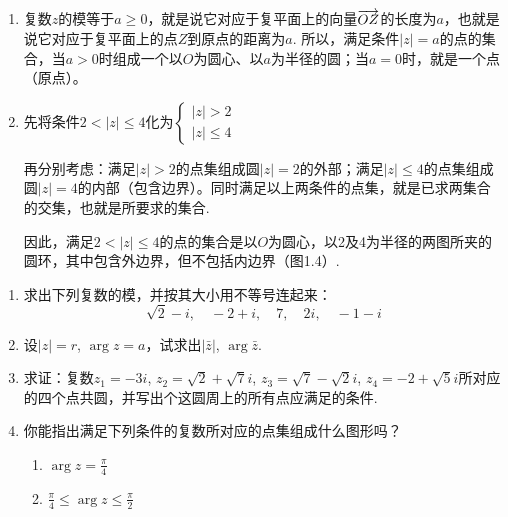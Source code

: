 \begin{solution}
\begin{enumerate}[(1)]
    \item 复数$z$的模等于$a\ge 0$，就是说它对应于复平面上的向量$\overrightarrow{OZ}$的长度为$a$，也就是说它对应于复平面上的点$Z$到原点的距离为$a$. 所以，满足条件$|z|=a$的点的集合，当$a>0$时组成一个以$O$为圆心、以$a$为半径的圆；当$a=0$时，就是一个点（原点）。
\item 先将条件$2<|z|\le 4$化为$\begin{cases}
    |z|>2\\ |z|\le 4
\end{cases}$

\begin{minipage}{.45\textwidth}
 再分别考虑：满足$|z|>2$的点集组成圆$|z|=2$的外部；满足$|z|\le 4$的点集组成圆$|z|=4$的内部（包含边界）。同时满足以上两条件的点集，就是已求两集合的交集，也就是所要求的集合.

因此，满足$2<|z|\le 4$的点的集合是以$O$为圆心，以2及4为半径的两图所夹的圆环，其中包含外边界，但不包括内边界（图1.4）.   
\end{minipage}\hfill
\begin{minipage}{.45\textwidth}
    \centering
{}
\end{minipage}

\end{enumerate}    
\end{solution}

\begin{ex}
\begin{enumerate}
    \item 求出下列复数的模，并按其大小用不等号连起来：
\[\sqrt{2}-i,\quad -2+i,\quad 7,\quad 2i,\quad -1-i\]
  \item   设$|z|=r$, $\arg z=a$，试求出$|\bar z|$, $\arg \bar z$.
  \item 求证：复数$z_1=-3i$, $z_2=\sqrt{2}+\sqrt{7}i$, $z_3=\sqrt{7}-\sqrt{2}i$, $z_4=-2+\sqrt{5}i$所对应的四个点共圆，并写出个这圆周上的所有点应满足的条件.
\item   你能指出满足下列条件的复数所对应的点集组成什么图形吗？
\begin{multicols}{2}
\begin{enumerate}[(1)]
    \item $\arg z=\frac{\pi}{4}$
    \item $\frac{\pi}{4}\le \arg z\le \frac{\pi}{2}$
\end{enumerate}
\end{multicols}
\end{enumerate}

\end{ex}

